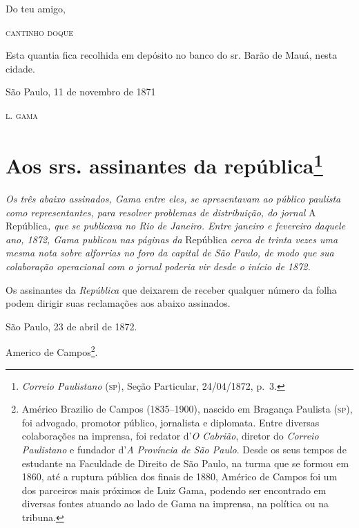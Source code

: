 \begin{flushright}
Do teu amigo,

\textsc{cantinho doque}
\end{flushright}

\asterisc

Esta quantia fica recolhida em depósito no banco do sr. Barão de Mauá,
nesta cidade.

\begin{flushright}
São Paulo, 11 de novembro de 1871

\textsc{l. gama}
\end{flushright}

\chapter{Aos srs. assinantes da república\footnote{\emph{Correio Paulistano} (\textsc{sp}), Seção Particular,
  24/04/1872, p.~3.}} %

\begin{didascalia}
\emph{Os três abaixo assinados, Gama entre eles, se apresentavam ao
público paulista como representantes, para resolver problemas de
distribuição, do jornal} A República\emph{, que se publicava no Rio de
Janeiro. Entre janeiro e fevereiro daquele ano, 1872, Gama publicou nas
páginas da} República \emph{cerca de trinta vezes uma mesma nota sobre
alforrias no foro da capital de São Paulo, de modo que sua colaboração
operacional com o jornal poderia vir desde o início de 1872.}
\end{didascalia}


Os assinantes da \emph{República} que deixarem de receber qualquer
número da folha podem dirigir suas reclamações aos abaixo assinados.

São Paulo, 23 de abril de 1872.

Americo de Campos\footnote{ Américo Brazilio de Campos (1835--1900),
  nascido em Bragança Paulista (\textsc{sp}), foi advogado, promotor público,
  jornalista e diplomata. Entre diversas colaborações na imprensa, foi
  redator d'\emph{O Cabrião}, diretor do \emph{Correio Paulistano} e
  fundador d'\emph{A Província de São Paulo}. Desde os seus tempos de
  estudante na Faculdade de Direito de São Paulo, na turma que se formou
  em 1860, até a ruptura pública dos finais de 1880, Américo de Campos
  foi um dos parceiros mais próximos de Luiz Gama, podendo ser
  encontrado em diversas fontes atuando ao lado de Gama na imprensa, na
  política ou na tribuna.}.

